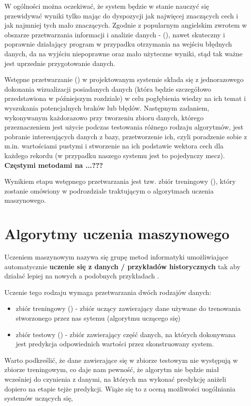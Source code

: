 W ogólności można oczekiwać, że system będzie w stanie nauczyć się przewidywać wyniki tylko mając do dyspozycji jak najwięcej znaczących cech i jak najmniej tych mało znaczących. Zgodnie z popularnym angielskim zwrotem w obszarze przetwarzania informacji i analizie danych -   (), nawet skuteczny i poprawnie działający program w przypadku otrzymania na wejściu błędnych danych, da na wyjściu niepoprawne oraz mało użyteczne wyniki, stąd tak ważne jest uprzednie przygotowanie danych.

Wstępne przetwarzanie () w projektowanym systemie składa się z jednorazowego dokonania wizualizacji posiadanych danych (która będzie szczegółowo przedstawiona w późniejszym rozdziale) w celu pogłębienia wiedzy na ich temat i wyszukania potencjalnych braków lub błędów. Następnym zadaniem, wykonywanym każdorazowo przy tworzeniu zbioru danych, którego przeznaczeniem jest użycie podczas testowania różnego rodzaju algorytmów, jest pobranie interesujących danych z bazy, przetworzenie ich, czyli poradzenie sobie z m.in. wartościami pustymi i stworzenie na ich podstawie wektora cech dla każdego rekordu (w przypadku naszego systemu jest to pojedynczy mecz). \textbf{Częstymi metodami na ...???}  

Wynikiem etapu wstępnego przetwarzania jest tzw. zbiór treningowy (), który zostanie omówiony w podrozdziale traktującym o algorytmach uczenia maszynowego.

\section{Algorytmy uczenia maszynowego}
Uczeniem maszynowym nazywa się grupę metod informatyki umożliwiające automatycznie \textbf{uczenie się z danych / przykładów historycznych} tak aby działać lepiej na nowych a podobnych przykładach \cite{Geron}. %

Uczenie tego rodzaju wymaga przetwarzania dwóch rodzajów danych:

\begin{itemize}
    \item zbiór treningowy () - zbiór uczący zawierający dane używane do trenowania stworzonego przez nas sytemu (algorytmu uczącego się)
    \item zbiór testowy () - zbiór zawierający część danych, na których dokonywana jest predykcja odpowiednich wartości przez skonstruowany system.
\end{itemize}
Warto podkreślić, że dane zawierające się w zbiorze testowym nie występują w zbiorze treningowym, co daje nam pewność, że algorytm nie będzie miał wcześniej do czynienia z danymi, na których ma wykonać predykcję aniżeli dopiero na etapie tejże predykcji. Wiąże się to z oceną możliwości uogólniania systemów uczących się, 

